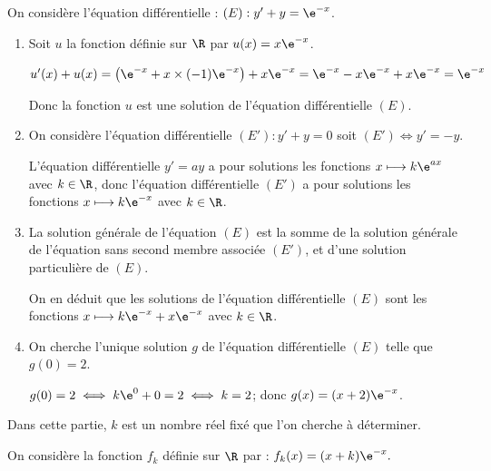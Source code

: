 


\medskip


\medskip


On considère l'équation différentielle :  $(E): y' + y = \e^{-x}$.

\begin{enumerate}
\item Soit $u$ la fonction définie sur $\R$ par $u(x) = x \e^{-x}$.

$u'(x)+u(x)=\left (\e^{-x}+x\times (-1)\e^{-x}\right )+x\e^{-x}
=\e^{-x}-x\e^{-x} + x\e^{-x} = \e^{-x}$

Donc  la fonction $u$ est une solution de l'équation différentielle $(E)$.

\item On considère l'équation différentielle $\left(E'\right): y' + y = 0$ soit $\left(E'\right) \iff y'=-y$.

L'équation différentielle $y'=ay$ a pour solutions les fonctions $x \longmapsto k\e^{ax}$ avec \mbox{$k\in\R$}, donc l'équation différentielle $\left(E'\right)$ a pour solutions les fonctions $x \longmapsto k\e^{-x}$ avec $k\in\R$.

\item %
La solution générale de l'équation $(E)$ est la somme de la solution générale de l'équation sans second membre associée $(E')$, et d'une solution particulière de $(E)$.

On en déduit que les solutions de l'équation différentielle $(E)$ sont les fonctions $x \longmapsto k\e^{-x} + x\e^{-x}$ avec $k\in\R$.

\item On cherche l'unique solution $g$ de l'équation différentielle $(E)$ telle que $g(0) = 2$.

$g(0)=2 \iff k\e^{0}+0=2 \iff k=2$; donc $g(x)=(x+2)\e^{-x}$.
\end{enumerate}


\medskip


\medskip


Dans cette partie, $k$ est un nombre réel fixé que l'on cherche à déterminer.

On considère la fonction $f_{k}$ définie sur $\R$ par : $f_{k}(x) = (x + k) \e^{-x}.$

